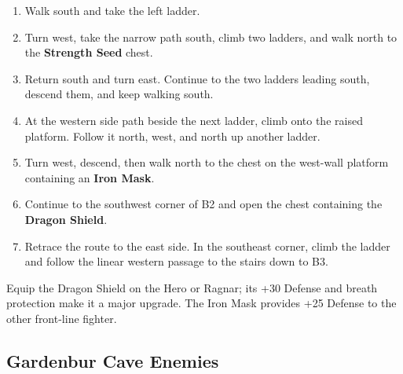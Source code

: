 \documentclass[
  american,
  10pt,
  letterpaper,
  oneside,
  open=any]{scrreprt}
\providecommand{\tightlist}{%
  \setlength{\itemsep}{0pt}\setlength{\parskip}{0pt}}
\begin{document}
\begin{enumerate}
\def\labelenumi{\arabic{enumi}.}
\tightlist
\item
  Walk south and take the left ladder.
\item
  Turn west, take the narrow path south, climb two ladders, and walk
  north to the \textbf{Strength Seed} chest.
\item
  Return south and turn east. Continue to the two ladders leading south,
  descend them, and keep walking south.
\item
  At the western side path beside the next ladder, climb onto the raised
  platform. Follow it north, west, and north up another ladder.
\item
  Turn west, descend, then walk north to the chest on the west-wall
  platform containing an \textbf{Iron Mask}.
\item
  Continue to the southwest corner of B2 and open the chest containing
  the \textbf{Dragon Shield}.
\item
  Retrace the route to the east side. In the southeast corner, climb the
  ladder and follow the linear western passage to the stairs down to B3.
\end{enumerate}

Equip the Dragon Shield on the Hero or Ragnar; its +30 Defense and
breath protection make it a major upgrade. The Iron Mask provides +25
Defense to the other front-line fighter.

\subsection{Gardenbur Cave Enemies}\label{gardenbur-cave-enemies}
\end{document}
